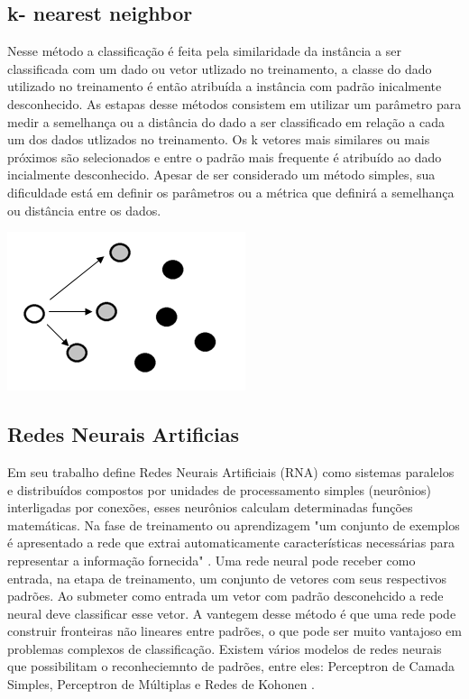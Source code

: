 \subsection{k- nearest neighbor}
Nesse método a classificação é feita pela similaridade da instância a ser classificada com um dado ou vetor utlizado no treinamento, a classe do dado utilizado no treinamento é então atribuída a instância com padrão inicalmente desconhecido. As estapas desse métodos consistem em utilizar um parâmetro para medir a semelhança ou a distância do dado a ser classificado em relação a cada um dos dados utlizados no treinamento. Os k vetores mais similares ou mais próximos são selecionados e entre o padrão mais frequente é atribuído ao dado incialmente desconhecido. Apesar de ser considerado um método simples, sua dificuldade está em definir os parâmetros ou a métrica que definirá a semelhança ou distância entre os dados\cite{Chagas09KNN}.
\begin{center}
	\includegraphics[scale=0.5]{graficos/KNN}
	\label{img:svm2}
\end{center}

\subsection{Redes Neurais Artificias}
Em seu trabalho   define Redes Neurais Artificiais (RNA) como sistemas paralelos e distribuídos compostos por unidades de processamento simples (neurônios) interligadas por conexões, esses neurônios calculam determinadas funções matemáticas. Na fase de treinamento ou aprendizagem "um conjunto de exemplos é apresentado a rede que extrai automaticamente características necessárias para representar a informação fornecida" \cite{Morais2010RNA}.
Uma rede neural pode receber como entrada, na etapa de treinamento, um conjunto de vetores com seus respectivos padrões. Ao submeter como entrada um vetor com padrão desconehcido a rede neural deve classificar esse vetor. A vantegem desse método é que uma rede pode construir fronteiras não lineares entre padrões, o que pode ser muito vantajoso em problemas complexos de classificação. Existem vários modelos de redes neurais que possibilitam o reconheciemnto de padrões, entre eles: Perceptron de Camada Simples, Perceptron de Múltiplas e Redes de Kohonen \cite{ZubenRNA2}.

